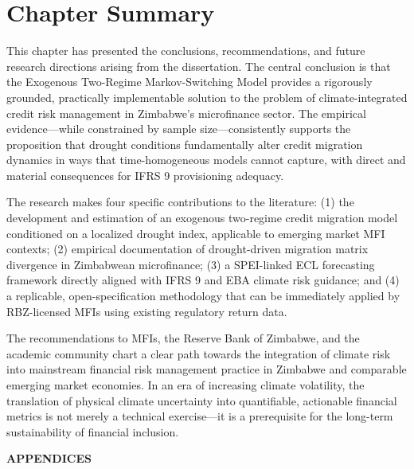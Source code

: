 \documentclass[12pt,a4paper]{article}
\begin{document}
\section{Chapter Summary}

This chapter has presented the conclusions, recommendations, and future research directions arising from the dissertation. The central conclusion is that the Exogenous Two-Regime Markov-Switching Model provides a rigorously grounded, practically implementable solution to the problem of climate-integrated credit risk management in Zimbabwe's microfinance sector. The empirical evidence---while constrained by sample size---consistently supports the proposition that drought conditions fundamentally alter credit migration dynamics in ways that time-homogeneous models cannot capture, with direct and material consequences for IFRS 9 provisioning adequacy.

The research makes four specific contributions to the literature: (1) the development and estimation of an exogenous two-regime credit migration model conditioned on a localized drought index, applicable to emerging market MFI contexts; (2) empirical documentation of drought-driven migration matrix divergence in Zimbabwean microfinance; (3) a SPEI-linked ECL forecasting framework directly aligned with IFRS 9 and EBA climate risk guidance; and (4) a replicable, open-specification methodology that can be immediately applied by RBZ-licensed MFIs using existing regulatory return data.

The recommendations to MFIs, the Reserve Bank of Zimbabwe, and the academic community chart a clear path towards the integration of climate risk into mainstream financial risk management practice in Zimbabwe and comparable emerging market economies. In an era of increasing climate volatility, the translation of physical climate uncertainty into quantifiable, actionable financial metrics is not merely a technical exercise---it is a prerequisite for the long-term sustainability of financial inclusion.

\newpage

\appendix
\begin{center}
    {\LARGE\bfseries APPENDICES}
\end{center}
\end{document}
